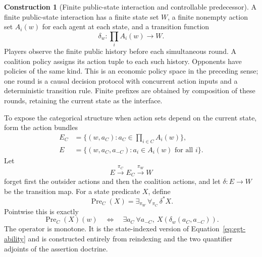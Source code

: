 \documentclass[11pt,a4paper]{article}
\numberwithin{equation}{section}
\theoremstyle{definition}
\newtheorem{construction}[construction]{Construction}
\theoremstyle{remark}
\theoremstyle{plain}
\begin{document}
\begin{construction}[Finite public-state interaction and controllable predecessor]
A finite public-state interaction has a finite state set $W$, a finite nonempty action set
$A_i(w)$ for each agent at each state, and a transition function
\[
 \delta_w:\prod_i A_i(w)\to W.
\]
Players observe the finite public history before each simultaneous
round. A coalition policy assigns its action tuple to each such
history. Opponents have policies of the same kind. This is an
economic policy space in the preceding sense; one round is a causal
decision protocol with concurrent action inputs and a deterministic
transition rule. Finite prefixes are obtained by composition of these
rounds, retaining the current state as the interface.

To expose the categorical structure when action sets depend on the current
state, form the action bundles
\begin{align*}
 E_C&=\{(w,a_C):a_C\in\prod_{i\in C}A_i(w)\},\\
 E&=\{(w,a_C,a_{-C}):a_i\in A_i(w)\text{ for all }i\}.
\end{align*}
Let
\[
 E\xrightarrow{\pi_C}E_C\xrightarrow{\pi_W}W
\]
forget first the outsider actions and then the coalition actions, and let
$\delta:E\to W$ be the transition map. For a state predicate $X$, define
\begin{equation}
\label{eq:egt-pre-doctrine}
 \operatorname{Pre}_C(X)
 =\exists_{\pi_W}\,\forall_{\pi_C}\,\delta^*X.
\end{equation}
Pointwise this is exactly
\[
 \operatorname{Pre}_C(X)(w)
 \quad\Longleftrightarrow\quad
 \exists a_C\ \forall a_{-C},\
                  X(\delta_w(a_C,a_{-C})).
\]
The operator is monotone. It is the state-indexed version of
Equation~\eqref{eq:egt-ability} and is constructed entirely from
reindexing and the two quantifier adjoints of the assertion doctrine.
\end{construction}
\end{document}
